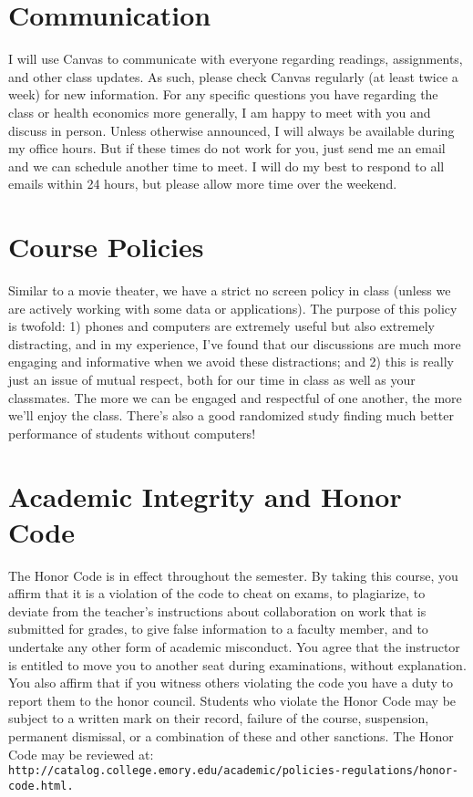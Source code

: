 \documentclass{article}
\begin{document}
\section*{Communication}
I will use Canvas to communicate with everyone regarding readings, assignments, and other class updates. As such, please check Canvas regularly (at least twice a week) for new information. For any specific questions you have regarding the class or health economics more generally, I am happy to meet with you and discuss in person. Unless otherwise announced, I will always be available during my office hours. But if these times do not work for you, just send me an email and we can schedule another time to meet. I will do my best to respond to all emails within 24 hours, but please allow more time over the weekend.

\section*{Course Policies}
Similar to a movie theater, we have a strict no screen policy in class (unless we are actively working with some data or applications). The purpose of this policy is twofold: 1) phones and computers are extremely useful but also extremely distracting, and in my experience, I've found that our discussions are much more engaging and informative when we avoid these distractions; and 2) this is really just an issue of mutual respect, both for our time in class as well as your classmates. The more we can be engaged and respectful of one another, the more we'll enjoy the class. There's also a good randomized study finding much better performance of students without computers!

\section*{Academic Integrity and Honor Code}
The Honor Code is in effect throughout the semester. By taking this course, you affirm that it is a violation of the code to cheat on exams, to plagiarize, to deviate from the teacher's instructions about collaboration on work that is submitted for grades, to give false information to a faculty member, and to undertake any other form of academic misconduct. You agree that the instructor is entitled to move you to another seat during examinations, without explanation. You also affirm that if you witness others violating the code you have a duty to report them to the honor council. Students who violate the Honor Code may be subject to a written mark on their record, failure of the course, suspension, permanent dismissal, or a combination of these and other sanctions. The Honor Code may be reviewed at: \texttt{http://catalog.college.emory.edu/academic/policies-regulations/honor-code.html.}
\end{document}
